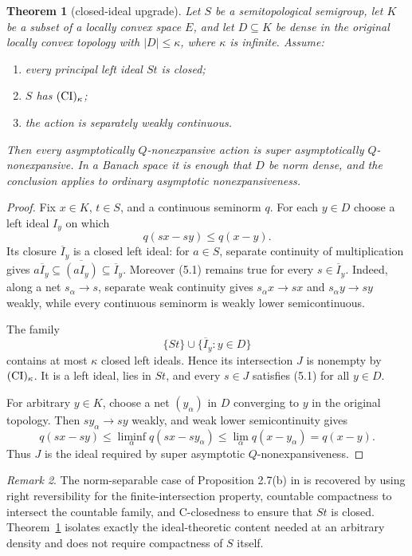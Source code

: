 \documentclass[11pt]{article}
\newtheorem{theorem}{Theorem}
\theoremstyle{definition}
\theoremstyle{remark}
\newtheorem{remark}[theorem]{Remark}
\newcommand{\cl}{\overline}
\begin{document}
\begin{theorem}[closed-ideal upgrade]\label{thm:ci}
Let $S$ be a semitopological semigroup, let $K$ be a subset of a locally
convex space $E$, and let $D\subseteq K$ be dense in the original locally
convex topology with $|D|\leq\kappa$, where $\kappa$ is infinite.  Assume:
\begin{enumerate}[label=(\roman*)]
 \item every principal left ideal $St$ is closed;
 \item $S$ has $({\rm CI})_\kappa$;
 \item the action is separately weakly continuous.
\end{enumerate}
Then every asymptotically $Q$-nonexpansive action is super asymptotically
$Q$-nonexpansive.  In a Banach space it is enough that $D$ be norm dense,
and the conclusion applies to ordinary asymptotic nonexpansiveness.
\end{theorem}

\begin{proof}
Fix $x\in K$, $t\in S$, and a continuous seminorm $q$.  For each $y\in D$
choose a left ideal $I_y$ on which
\[
 q(sx-sy)\leq q(x-y).                                      \tag{5.1}
\]
Its closure $\cl I_y$ is a closed left ideal: for $a\in S$, separate
continuity of multiplication gives
$a\cl I_y\subseteq\cl{(aI_y)}\subseteq\cl I_y$.  Moreover (5.1) remains
true for every $s\in\cl I_y$.  Indeed, along a net $s_\alpha\to s$, separate
weak continuity gives $s_\alpha x\to sx$ and $s_\alpha y\to sy$ weakly,
while every continuous seminorm is weakly lower semicontinuous.

The family
\[
 \{St\}\cup\{\cl I_y:y\in D\}
\]
contains at most $\kappa$ closed left ideals.  Hence its intersection $J$ is
nonempty by $({\rm CI})_\kappa$.  It is a left ideal, lies in $St$, and every
$s\in J$ satisfies (5.1) for all $y\in D$.

For arbitrary $y\in K$, choose a net $(y_\alpha)$ in $D$ converging to $y$
in the original topology.  Then $s y_\alpha\to sy$ weakly, and weak lower
semicontinuity gives
\[
 q(sx-sy)\leq\liminf_\alpha q(sx-sy_\alpha)
 \leq\lim_\alpha q(x-y_\alpha)=q(x-y).
\]
Thus $J$ is the ideal required by super asymptotic
$Q$-nonexpansiveness.
\end{proof}

\begin{remark}
The norm-separable case of Proposition 2.7(b) in \cite{MW} is recovered by
using right reversibility for the finite-intersection property, countable
compactness to intersect the countable family, and C-closedness to ensure
that $St$ is closed.  Theorem~\ref{thm:ci} isolates exactly the ideal-theoretic
content needed at an arbitrary density and does not require compactness of
$S$ itself.
\end{remark}
\end{document}

